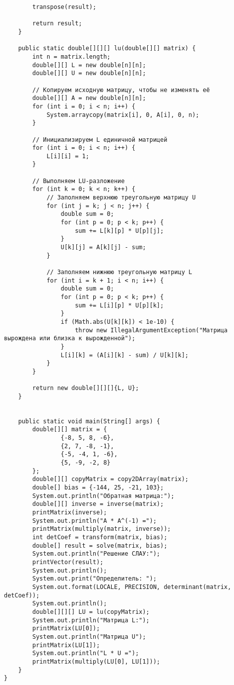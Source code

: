 \begin{verbatim}
        transpose(result);

        return result;
    }

    public static double[][][] lu(double[][] matrix) {
        int n = matrix.length;
        double[][] L = new double[n][n];
        double[][] U = new double[n][n];

        // Копируем исходную матрицу, чтобы не изменять её
        double[][] A = new double[n][n];
        for (int i = 0; i < n; i++) {
            System.arraycopy(matrix[i], 0, A[i], 0, n);
        }

        // Инициализируем L единичной матрицей
        for (int i = 0; i < n; i++) {
            L[i][i] = 1;
        }

        // Выполняем LU-разложение
        for (int k = 0; k < n; k++) {
            // Заполняем верхнюю треугольную матрицу U
            for (int j = k; j < n; j++) {
                double sum = 0;
                for (int p = 0; p < k; p++) {
                    sum += L[k][p] * U[p][j];
                }
                U[k][j] = A[k][j] - sum;
            }

            // Заполняем нижнюю треугольную матрицу L
            for (int i = k + 1; i < n; i++) {
                double sum = 0;
                for (int p = 0; p < k; p++) {
                    sum += L[i][p] * U[p][k];
                }
                if (Math.abs(U[k][k]) < 1e-10) {
                    throw new IllegalArgumentException("Матрица вырождена или близка к вырожденной");
                }
                L[i][k] = (A[i][k] - sum) / U[k][k];
            }
        }

        return new double[][][]{L, U};
    }


    public static void main(String[] args) {
        double[][] matrix = {
                {-8, 5, 8, -6},
                {2, 7, -8, -1},
                {-5, -4, 1, -6},
                {5, -9, -2, 8}
        };
        double[][] copyMatrix = copy2DArray(matrix);
        double[] bias = {-144, 25, -21, 103};
        System.out.println("Обратная матрица:");
        double[][] inverse = inverse(matrix);
        printMatrix(inverse);
        System.out.println("A * A^(-1) =");
        printMatrix(multiply(matrix, inverse));
        int detCoef = transform(matrix, bias);
        double[] result = solve(matrix, bias);
        System.out.println("Решение СЛАУ:");
        printVector(result);
        System.out.println();
        System.out.print("Определитель: ");
        System.out.format(LOCALE, PRECISION, determinant(matrix, detCoef));
        System.out.println();
        double[][][] LU = lu(copyMatrix);
        System.out.println("Матрица L:");
        printMatrix(LU[0]);
        System.out.println("Матрица U");
        printMatrix(LU[1]);
        System.out.println("L * U =");
        printMatrix(multiply(LU[0], LU[1]));
    }
}
\end{verbatim}

